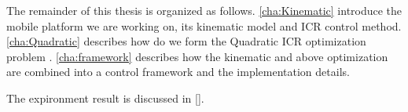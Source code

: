 The remainder of this thesis is organized as follows.
\cref{cha:Kinematic} introduce the mobile platform we are working on, its kinematic model and ICR control method.
\cref{cha:Quadratic} describes how do we form the Quadratic ICR optimization problem .
\cref{cha:framework} describes how the kinematic and above optimization are combined into a control framework and the implementation details.

The expironment result is discussed in \cref{}.